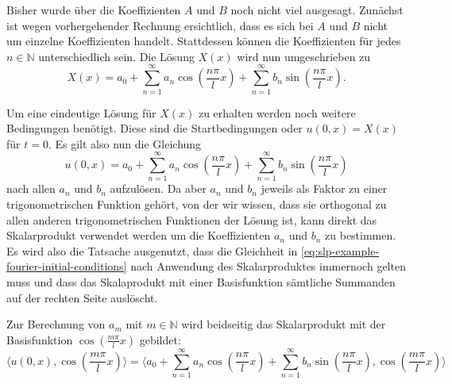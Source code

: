 
Bisher wurde über die Koeffizienten $A$ und $B$ noch nicht viel ausgesagt.
Zunächst ist wegen vorhergehender Rechnung ersichtlich, dass es sich bei
$A$ und $B$ nicht um einzelne Koeffizienten handelt.
Stattdessen können die Koeffizienten für jedes $n \in \mathbb{N}$
unterschiedlich sein.
Die Lösung $X(x)$ wird nun umgeschrieben zu
\[
    X(x)
    =
    a_0
    +
    \sum_{n = 1}^{\infty} a_n\cos\left(\frac{n\pi}{l}x\right)
    +
    \sum_{n = 1}^{\infty} b_n\sin\left(\frac{n\pi}{l}x\right).
\]

Um eine eindeutige Lösung für $ X(x) $ zu erhalten werden noch weitere
Bedingungen benötigt.
Diese sind die Startbedingungen oder $u(0, x) = X(x)$ für $t = 0$.
Es gilt also nun die Gleichung
\begin{equation}
    \label{eq:slp-example-fourier-initial-conditions}
    u(0, x)
    =
    a_0
    +
    \sum_{n = 1}^{\infty} a_n\cos\left(\frac{n\pi}{l}x\right)
    +
    \sum_{n = 1}^{\infty} b_n\sin\left(\frac{n\pi}{l}x\right)
\end{equation}
nach allen $a_n$ und $b_n$ aufzulösen.
Da aber $a_n$ und $b_n$ jeweils als Faktor zu einer trigonometrischen Funktion
gehört, von der wir wissen, dass sie orthogonal zu allen anderen
trigonometrischen Funktionen der Lösung ist, kann direkt das Skalarprodukt
verwendet werden um die Koeffizienten $a_n$ und $b_n$ zu bestimmen.
Es wird also die Tatsache ausgenutzt, dass die Gleichheit in
\eqref{eq:slp-example-fourier-initial-conditions} nach Anwendung des
Skalarproduktes immernoch gelten muss und dass das Skalaprodukt mit einer
Basisfunktion sämtliche Summanden auf der rechten Seite auslöscht.

Zur Berechnung von $a_m$ mit $ m \in \mathbb{N} $ wird beidseitig das
Skalarprodukt mit der Basisfunktion $ \cos\left(\frac{m \pi}{l}x\right)$
gebildet:
\[
    \langle u(0, x), \cos\left(\frac{m \pi}{l}x\right) \rangle
    =
    \langle a_0
    +
    \sum_{n = 1}^{\infty} a_n\cos\left(\frac{n\pi}{l}x\right)
    +
    \sum_{n = 1}^{\infty} b_n\sin\left(\frac{n\pi}{l}x\right),
    \cos\left(\frac{m \pi}{l}x\right)\rangle
\]


